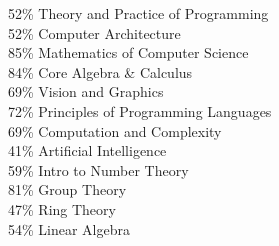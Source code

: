 \documentclass[11pt, a4paper]{cv}
\begin{document}
\begin{minipage}[t]{0.66\textwidth}
\begin{minipage}[t]{0.55\textwidth}
52\% Theory and Practice of Programming \\
52\% Computer Architecture \\
85\% Mathematics of Computer Science \\
84\% Core Algebra \& Calculus \\
\vspace{0.5em}
69\% Vision and Graphics \\
72\% Principles of Programming Languages \\
69\% Computation and Complexity \\
41\% Artificial Intelligence \\
59\% Intro to Number Theory \\
81\% Group Theory \\
47\% Ring Theory \\
54\% Linear Algebra

\end{minipage}

\sectionspace %

\end{minipage} %
\end{document}
